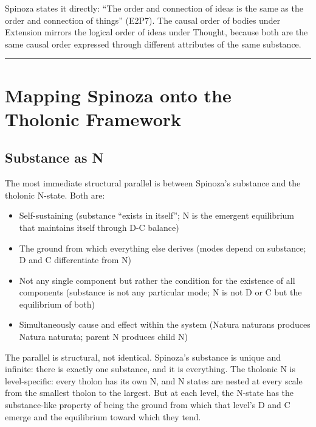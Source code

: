 \documentclass[12pt]{article}
\providecommand{\tightlist}{%
  \setlength{\itemsep}{0pt}\setlength{\parskip}{0pt}}
\begin{document}
Spinoza states it directly: ``The order and connection of ideas is the
same as the order and connection of things'' (E2P7). The causal order of
bodies under Extension mirrors the logical order of ideas under Thought,
because both are the same causal order expressed through different
attributes of the same substance.

\begin{center}\rule{0.5\linewidth}{0.5pt}\end{center}

\section{Mapping Spinoza onto the Tholonic Framework}\label{mapping-spinoza-onto-the-tholonic-framework}

\subsection{Substance as N}\label{substance-as-n}

The most immediate structural parallel is between Spinoza's substance
and the tholonic N-state. Both are:

\begin{itemize}
\tightlist
\item
  Self-sustaining (substance ``exists in itself''; N is the emergent
  equilibrium that maintains itself through D-C balance)
\item
  The ground from which everything else derives (modes depend on
  substance; D and C differentiate from N)
\item
  Not any single component but rather the condition for the existence of
  all components (substance is not any particular mode; N is not D or C
  but the equilibrium of both)
\item
  Simultaneously cause and effect within the system (Natura naturans
  produces Natura naturata; parent N produces child N)
\end{itemize}

The parallel is structural, not identical. Spinoza's substance is unique
and infinite: there is exactly one substance, and it is everything. The
tholonic N is level-specific: every tholon has its own N, and N states
are nested at every scale from the smallest tholon to the largest. But
at each level, the N-state has the substance-like property of being the
ground from which that level's D and C emerge and the equilibrium toward
which they tend.
\end{document}
